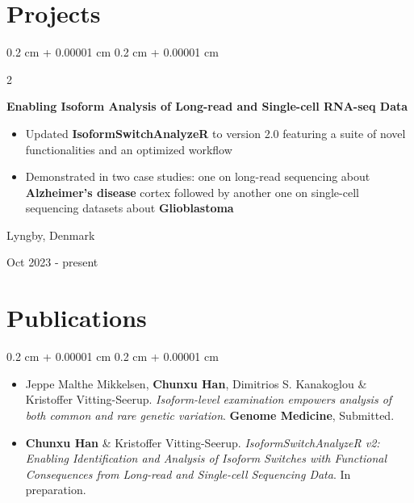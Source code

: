 \documentclass[10pt, letterpaper]{article}
\newenvironment{highlights}{
    \begin{itemize}[
        topsep=0.10 cm,
        parsep=0.10 cm,
        partopsep=0pt,
        itemsep=0pt,
        leftmargin=0.4 cm + 10pt
    ]
}{
    \end{itemize}
} %
\newenvironment{onecolentry}{
    \begin{adjustwidth}{
        0.2 cm + 0.00001 cm
    }{
        0.2 cm + 0.00001 cm
    }
}{
    \end{adjustwidth}
} %
\newenvironment{twocolentry}[2][]{
    \onecolentry
    \def\secondColumn{#2}
    \setcolumnwidth{\fill, 4.5 cm}
    \begin{paracol}{2}
}{
    \switchcolumn \raggedleft \secondColumn
    \end{paracol}
    \endonecolentry
} %
\begin{document}
    \section{Projects}

        \begin{twocolentry}{
            Lyngby, Denmark
            
            Oct 2023 - present
        }
            \textbf{Enabling Isoform Analysis of Long-read and Single-cell RNA-seq Data}
            \begin{highlights}
                \item Updated \textbf{IsoformSwitchAnalyzeR} to version 2.0 featuring a suite of novel functionalities and an optimized workflow
                \item Demonstrated in two case studies: one on long-read sequencing about \textbf{Alzheimer's disease} cortex followed by another one on single-cell sequencing datasets about \textbf{Glioblastoma}
            \end{highlights}
        \end{twocolentry}

        \vspace{0.3 cm}

    
    \section{Publications}

        
        \begin{onecolentry}
            \begin{itemize}
                \item Jeppe Malthe Mikkelsen, \textbf{Chunxu Han}, Dimitrios S. Kanakoglou \& Kristoffer Vitting-Seerup. \textit{Isoform-level examination empowers analysis of both common and rare genetic variation}. \textbf{Genome Medicine}, Submitted.

                \vspace{0.1 cm}
    
                \item \textbf{Chunxu Han} \& Kristoffer Vitting-Seerup. \textit{IsoformSwitchAnalyzeR v2: Enabling Identification and Analysis of Isoform Switches with Functional Consequences from Long-read and Single-cell Sequencing Data}. In preparation.
\end{itemize}
        \end{onecolentry}
\end{document}
